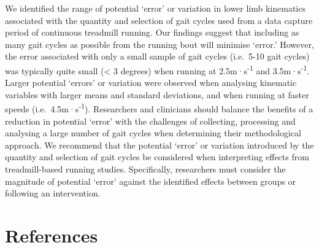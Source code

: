 \documentclass[]{elsarticle} %
\begin{document}
We identified the range of potential `error' or variation in lower limb
kinematics associated with the quantity and selection of gait cycles
used from a data capture period of continuous treadmill running. Our
findings suggest that including as many gait cycles as possible from the
running bout will minimise `error.' However, the error associated with
only a small sample of gait cycles (i.e.~5-10 gait cycles) was typically
quite small (\textless{} 3 degrees) when running at
2.5m·s\textsuperscript{-1} and 3.5m·s\textsuperscript{-1}. Larger
potential `errors' or variation were observed when analysing kinematic
variables with larger means and standard deviations, and when running at
faster speeds (i.e.~4.5m·s\textsuperscript{-1}). Researchers and
clinicians should balance the benefits of a reduction in potential
`error' with the challenges of collecting, processing and analysing a
large number of gait cycles when determining their methodological
approach. We recommend that the potential `error' or variation
introduced by the quantity and selection of gait cycles be considered
when interpreting effects from treadmill-based running studies.
Specifically, researchers must consider the magnitude of potential
`error' against the identified effects between groups or following an
intervention.

\newpage

\hypertarget{references}{%
\section*{References}\label{references}}
\end{document}

